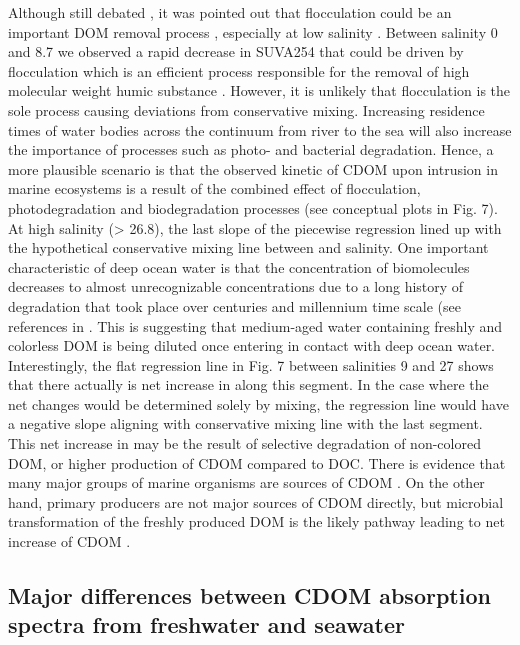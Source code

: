 Although still debated \citep{Markager2004, DelCastillo2000}, it was pointed out that flocculation could be an important DOM removal process \citep{Sholkovitz1976}, especially at low salinity \citep{Asmala2014a}. Between salinity 0 and 8.7 we observed a rapid decrease in SUVA254 that could be driven by flocculation which is an efficient process responsible for the removal of high molecular weight humic substance \citep{Asmala2014a}. However, it is unlikely that flocculation is the sole process causing deviations from conservative mixing. Increasing residence times of water bodies across the continuum from river to the sea will also increase the importance of processes such as photo- and bacterial degradation. Hence, a more plausible scenario is that the observed kinetic of CDOM upon intrusion in marine ecosystems is a result of the combined effect of flocculation, photodegradation and biodegradation processes (see conceptual plots in Fig. 7). At high salinity (> 26.8), the last slope of the piecewise regression lined up with the hypothetical conservative mixing line between  and salinity. One important characteristic of deep ocean water is that the concentration of biomolecules decreases to almost unrecognizable concentrations due to a long history of degradation that took place over centuries and millennium time scale (see references in \cite{Dittmar2014}. This is suggesting that medium-aged water containing freshly and colorless DOM is being diluted once entering in contact with deep ocean water. Interestingly, the flat regression line in Fig. 7 between salinities 9 and 27 shows that there actually is net increase in  along this segment. In the case where the net changes would be determined solely by mixing, the regression line would have a negative slope aligning with conservative mixing line with the last segment. This net increase in  may be the result of selective degradation of non-colored DOM, or higher production of CDOM compared to DOC. There is evidence that many major groups of marine organisms are sources of CDOM \citep{Steinberg2004}. On the other hand, primary producers are not major sources of CDOM directly, but microbial transformation of the freshly produced DOM is the likely pathway leading to net increase of CDOM \citep{Rochelle-Newall2002, Yamashita2004}.

\subsection*{Major differences between CDOM absorption spectra from freshwater and seawater}

